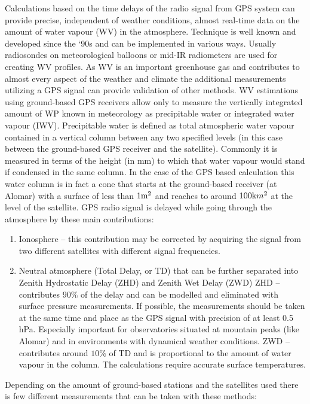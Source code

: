 \documentclass[]{book}
\begin{document}
	Calculations based on the time delays of the radio signal from GPS system can provide precise, independent of weather conditions, almost real-time data on the amount of water vapour (WV) in the atmosphere. Technique is well known and developed since the ‘90s and can be implemented in various ways. Usually radiosondes on meteorological balloons or mid-IR radiometers are used for creating WV profiles. As WV is an important greenhouse gas and contributes to almost every aspect of the weather and climate the additional measurements utilizing a GPS signal can provide validation of other methods.
	WV estimations using ground-based GPS receivers allow only to measure the vertically integrated amount of WP known in meteorology as precipitable water or integrated water vapour (IWV).
	Precipitable water is defined as total atmospheric water vapour contained in a vertical column between any two specified levels (in this case between the ground-based GPS receiver and the satellite). Commonly it is measured in terms of the height (in mm) to which that water vapour would stand if condensed in the same column.
	In the case of the GPS based calculation this water column is in fact a cone that starts at the ground-based receiver (at Alomar) with a surface of less than $1 \textrm m^2$ and reaches to around $100 \textrm km^2$ at the level of the satellite.
	GPS radio signal is delayed while going through the atmosphere by these main contributions:
	\begin{enumerate}
		\item Ionosphere – this contribution may be corrected by acquiring the signal from two different satellites with different signal frequencies. 
		\item Neutral atmosphere (Total Delay, or TD) that can be further separated into Zenith Hydrostatic Delay (ZHD) and Zenith Wet Delay (ZWD)
			\subitem ZHD – contributes $90 \%$ of the delay and can be modelled and eliminated with surface pressure measurements. If possible, the measurements should be taken at the same time and place as the GPS signal with precision of at least 0.5 hPa. Especially important for observatories situated at mountain peaks (like Alomar) and in environments with dynamical weather conditions. 
			\subitem ZWD – contributes around $10 \%$ of TD and is proportional to the amount of water vapour in the column. The calculations require accurate surface temperatures.
	\end{enumerate}

	Depending on the amount of ground-based stations and the satellites used there is few different measurements that can be taken with these methods:
	
\end{document}
